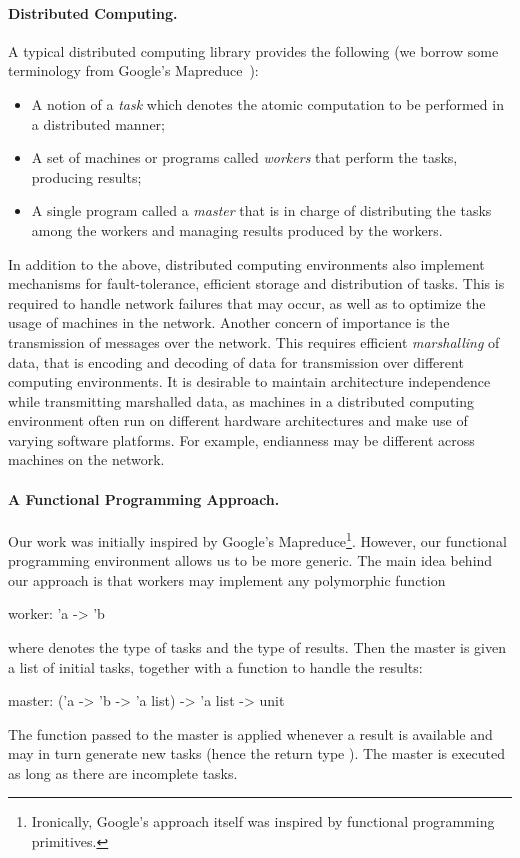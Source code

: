 \documentclass[preprint]{sigplanconf}
\begin{document}
\paragraph{Distributed Computing.}
A typical distributed computing library provides the following (we
borrow some terminology from Google's Mapreduce~\cite{mapreduce}):
\begin{itemize}
\item A notion of a \emph{task} which denotes the atomic computation to be
  performed in a distributed manner;
\item A set of machines or programs called \emph{workers} that perform
  the tasks, producing results;
\item A single program called a \emph{master} that is in charge
  of distributing the tasks among the workers and managing results
  produced by the workers.
\end{itemize}
In addition to the above, distributed computing environments also
implement mechanisms for fault-tolerance, efficient storage and
distribution of tasks. This is required to handle network failures
that may occur, as well as to optimize the usage of machines in the
network. Another concern of importance is the transmission of messages
over the network. This requires efficient 
\emph{marshalling} of data, that is encoding and decoding of data 
for transmission over different computing environments.  It is desirable to
maintain architecture independence while transmitting marshalled data,
as machines in a distributed computing environment often run on
different hardware architectures and make use of varying software
platforms. For example, endianness may be different across machines on
the network.

\paragraph{A Functional Programming Approach.}
Our work was initially inspired by Google's
Mapreduce\footnote{Ironically, Google's approach itself was inspired
  by functional programming primitives.}. However, our functional
programming environment allows us to be more generic. 
The main idea behind our approach is that
workers may implement any polymorphic function
\begin{ocaml}
  worker: 'a -> 'b
\end{ocaml}
where  denotes the type of tasks and  the type of results.
Then the master is given a list of initial tasks, together with a
function to handle the results:
\begin{ocaml}
  master: ('a -> 'b -> 'a list) -> 'a list -> unit
\end{ocaml}
The function passed to the master is applied whenever a result is
available and may in turn generate new tasks (hence the return type
).  The master is executed as long as there are incomplete
tasks.
\end{document}
